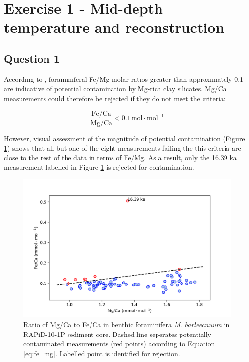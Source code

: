 \section{Exercise 1 - Mid-depth temperature and  reconstruction}

\subsection{Question 1}
\label{sec:Q1}
According to \citeauthor{barker2003study} \parencite{barker2003study}, foraminiferal Fe/Mg molar ratios greater than approximately 0.1 are indicative of potential contamination by Mg-rich clay silicates.
Mg/Ca measurements could therefore be rejected if they do not meet the criteria:

\begin{equation} \label{eq:fe_mg}
    \frac{\mathrm{Fe}/\mathrm{Ca}}{\mathrm{Mg}/\mathrm{Ca}} < 0.1 \, \mathrm{mol \cdot mol^{-1}}
\end{equation}

However, visual assessment of the magnitude of potential contamination (Figure \ref{fig:Mg_Fe}) shows that all but one of the eight measurements failing the this criteria are close to the rest of the data in terms of Fe/Mg.
As a result, only the 16.39 ka measurement labelled in Figure \ref{fig:Mg_Fe} is rejected for contamination.

\begin{figure}[h]
\includegraphics[width=\textwidth]{img/scatter_MgCa_x_FeCa_contaminated.pdf}
    \caption{Ratio of Mg/Ca to Fe/Ca in benthic foraminifera \emph{M. barleeanuum} in RAPiD-10-1P sediment core.
             Dashed line seperates potentially contaminated measurements (red points) according to Equation \ref{eq:fe_mg}.
             Labelled point is identified for rejection.}
        \label{fig:Mg_Fe}
\end{figure}

